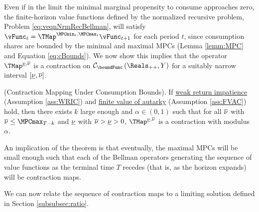 \documentclass[BufferStockTheory]{subfiles}
\begin{document}
Even if in the limit the minimal marginal propensity to consume approaches zero, the finite-horizon value functions defined by the normalized recursive problem, Problem \eqref{eq:veqnNrmRecBellman}, will satisfy  $\vFunc_{t} = \TMap^{\MPCmin_{t}, \MPCmax_{t}}\vFunc_{t+1}$ for each period $t$, since consumption shares are bounded by the minimal and maximal MPCs (Lemma \ref{lemm:MPC} and Equation \eqref{eq:cBounds}).
We now show this implies that the operator $\TMap^{\MPCminInf, \MPCmaxInf}$ is a contraction on $\mathcal{C}_{\boundFunc }\left( \Reals_{++},Y\right)$ for a suitably narrow interval $[\underline{\nu}, \overline{\nu}]$.


\begin{theorem}(Contraction Mapping Under Consumption Bounds).
\label{thm:cmap}
If \hyperlink{WRIC}{weak return impatience} (Assumption \ref{ass:WRIC})  and  \hyperlink{FVAC}{finite value of autarky} (Assumption \ref{ass:FVAC}) hold, then there exists $k$ large enough and $\alpha\in (0,1)$ such that for all $\overline{\nu}$ with $\MPCmaxInf\leq \MPCmax_{T-k}$ and $\underline{\nu}$ with $\overline{\nu}> \underline{\nu}>0$, $\TMap^{\MPCminInf, \MPCmaxInf}$ is a contraction with modulus $\alpha$.
\end{theorem}

An implication of the theorem is that eventually, the maximal MPCs will be small enough such that each of the Bellman operators generating the sequence of value functions as the terminal time $T$ recedes (that is, as the horizon expands) will be contraction maps.

\begin{comment}
The proof is provided in the appendix and we discuss two key arguments of the proof here.
First, the proof shows that $\boundFunc$ satisfies the conditions of Boyd's Contraction Mapping Theorem if we use the weighting function:
%
\begin{equation}
\boundFunc(x) = \bar{M} + x^{1-\gamma},
\end{equation}
%
where $\bar{M}$ is a constant derived from the model primitives and the upper and bound on the consumption share.
Intuitively, Boyd's theorem shows that if one can find a $\boundFunc$ that is everywhere finite but goes to infinity `as fast or faster' than the function you are normalizing with $\boundFunc$, the normalized problem defines a contraction mapping.

\end{comment} 
We can now relate the sequence of contraction maps to a limiting solution defined in Section \ref{subsubsec:ratio}.
\end{document}
